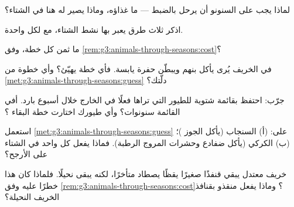 \begin{exercise}[$\star$]\label{exo:g3:animals-through-seasons:4}
لماذا يجب على السنونو أن يرحل بالضبط --- ما غذاؤه، وماذا يصير له
هنا في الشتاء؟
\end{exercise}

\begin{exercise}[$\star$]\label{exo:g3:animals-through-seasons:5}
اذكر ثلاث طرق يعبر بها  نشط الشتاء، مع  لكل واحدة.
\end{exercise}

\begin{exercise}[$\star$]\label{exo:g3:animals-through-seasons:6}
ما ثمن كل خطة، وفق \cref{rem:g3:animals-through-seasons:cost}؟
\end{exercise}

\begin{exercise}[$\star$]\label{exo:g3:animals-through-seasons:7}
في الخريف يُرى  يأكل بنهم ويبطّن حفرة  يابسة. فأي خطة
يهيّئ؟ وأي خطوة من \cref{met:g3:animals-through-seasons:guess}
دلّتك؟
\end{exercise}

\begin{exercise}[$\star$]\label{exo:g3:animals-through-seasons:8}
جرّب: احتفظ بقائمة شتوية للطيور التي تراها فعلًا في الخارج خلال
أسبوع بارد. أفي القائمة سنونوات؟ وأي طيورك اختارت خطة البقاء
؟
\end{exercise}

\begin{exercise}[$\star\star$]\label{exo:g3:animals-through-seasons:9}
استعمل \cref{met:g3:animals-through-seasons:guess} على: (أ)
السنجاب (يأكل الجوز )؛ (ب) الكركي (يأكل ضفادع وحشرات
المروج الرطبة). فماذا يفعل كل واحد في الشتاء على الأرجح؟
\end{exercise}

\begin{exercise}[$\star\star$]\label{exo:g3:animals-through-seasons:10}
خريف معتدل يبقي قنفذًا صغيرًا يقظًا يصطاد متأخرًا، لكنه يبقى
نحيلًا. فلماذا كان هذا خطرًا عليه وفق
\cref{rem:g3:animals-through-seasons:cost}؟ وماذا يفعل منقذو
 بقنافذ الخريف النحيلة؟
\end{exercise}
